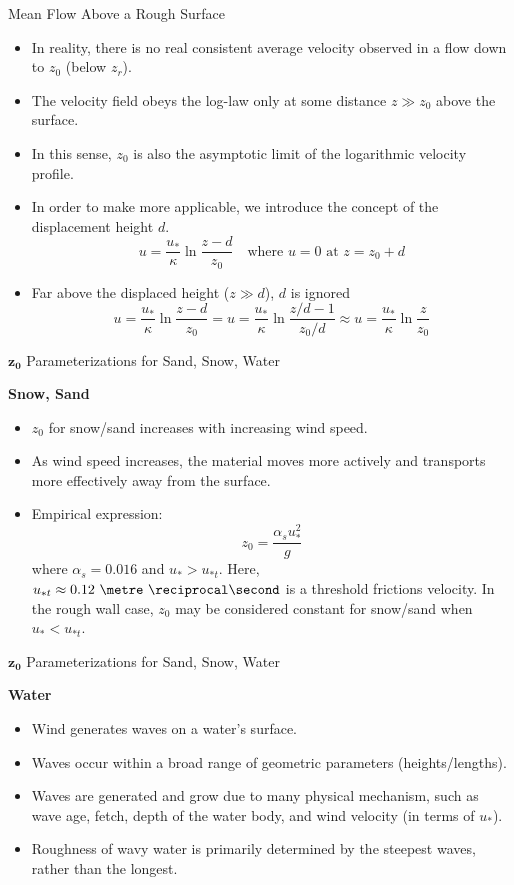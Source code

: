 \begin{frame}{Mean Flow Above a Rough Surface}

\begin{itemize}
	\item In reality, there is no real consistent average velocity observed in a flow down to $z_0$ (below $z_r$).
	\item The velocity field obeys the log-law only at some distance $z\gg z_0$ above the surface.
	\item In this sense, $z_0$ is also the asymptotic limit of the logarithmic velocity profile.
	\item In order to make more applicable, we introduce the concept of the displacement height $d$.
	$$u = \frac{u_*}{\kappa}\ln{\frac{z-d}{z_0}} \quad \text{where } u=0 \text{ at } z=z_0+d$$
	\item Far above the displaced height ($z\gg d$), $d$ is ignored
	$$u = \frac{u_*}{\kappa}\ln{\frac{z-d}{z_0}} = u = \frac{u_*}{\kappa}\ln{\frac{z/d-1}{z_0/d}} \approx u = \frac{u_*}{\kappa}\ln{\frac{z}{z_0}}$$
\end{itemize}
\end{frame}
\begin{frame}{$\mathbf{z_0}$ Parameterizations for Sand, Snow, Water}

\textbf{Snow, Sand}
\begin{itemize}
	\item $z_0$ for snow/sand increases with increasing wind speed.
	\item As wind speed increases, the material moves more actively and transports more effectively away from the surface.
	\item Empirical expression:
	$$z_0 = \frac{\alpha_s u_*^2}{g}$$
	where $\alpha_s = 0.016$ and $u_* > u_{*t}$. Here, $u_{*t} \approx 0.12\ \metre\ \reciprocal\second$ is a threshold frictions velocity. In the rough wall case, $z_0$ may be considered constant for snow/sand when $u_*<u_{*t}$.
\end{itemize}
\end{frame}
\begin{frame}{$\mathbf{z_0}$ Parameterizations for Sand, Snow, Water}

\textbf{Water}
\begin{itemize}
	\item Wind generates waves on a water's surface.
	\item Waves occur within a broad range of geometric parameters (heights/lengths).
	\item Waves are generated and grow due to many physical mechanism, such as wave age, fetch, depth of the water body, and wind velocity (in terms of $u_*$).
	\item Roughness of wavy water is primarily determined by the steepest waves, rather than the longest.
\end{itemize}
\end{frame}

